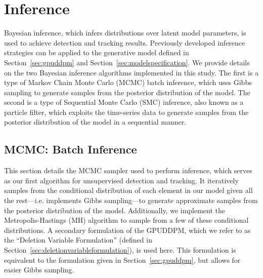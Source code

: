 \documentclass{article}
\begin{document}




\section{Inference}
\label{sec:inference}

Bayesian inference, which infers distributions over latent model parameters, is used to achieve detection and tracking results. Previously developed inference strategies can be applied to the generative model defined in Section~\ref{sec:gpuddpm} and Section~\ref{sec:modelspecification}. We provide details on the two Bayesian inference algorithms implemented in this study. The first is a type of Markov Chain Monte Carlo (MCMC) batch inference, which uses Gibbs sampling to generate samples from the posterior distribution of the model. The second is a type of Sequential Monte Carlo (SMC) inference, also known as a particle filter, which exploits the time-series data to generate samples from the posterior distribution of the model in a sequential manner.


\subsection{MCMC: Batch Inference}
\label{sec:MCMC}

This section details the MCMC sampler used to perform inference, which serves as our first algorithm for unsupervised detection and tracking. It iteratively samples from the conditional distribution of each element in our model given all the rest---i.e. implements Gibbs sampling---to generate approximate samples from the posterior distribution of the model. Additionally, we implement the Metropolis-Hastings (MH) algorithm to sample from a few of these conditional distributions. A secondary formulation of the GPUDDPM, which we refer to as the ``Deletion Variable Formulation'' (defined in Section~\ref{sec:deletionvariableformulation}), is used here. This formulation is equivalent to the formulation given in Section~\ref{sec:gpuddpm}, but allows for easier Gibbs sampling.
\end{document}
